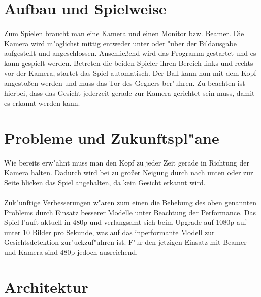 \documentclass[12pt]{article}
\begin{document}
\section{Aufbau und Spielweise}
\paragraph{}
Zum Spielen braucht man eine Kamera und einen Monitor bzw. Beamer. Die Kamera
wird m"oglichst mittig entweder unter oder "uber der Bildausgabe aufgestellt und angeschlossen.
Anschließend wird das Programm gestartet und es kann gespielt werden.
Betreten die beiden Spieler ihren Bereich links und rechts vor der Kamera,
startet das Spiel automatisch. Der Ball kann nun mit dem Kopf angestoßen werden
und muss das Tor des Gegners ber"uhren. Zu beachten ist hierbei, dass
das Gesicht jederzeit gerade zur Kamera gerichtet sein muss, damit es erkannt werden kann.
\section{Probleme und Zukunftspl"ane}
\paragraph{}
Wie bereits erw"ahnt muss man den Kopf zu jeder Zeit gerade in Richtung
der Kamera halten. Dadurch wird bei zu großer Neigung durch nach unten oder zur
Seite blicken das Spiel angehalten, da kein Gesicht erkannt wird.
\paragraph{}
Zuk"unftige Verbesserungen w"aren zum einen die Behebung des oben genannten Problems
durch Einsatz besserer Modelle unter Beachtung der Performance. Das Spiel l"auft aktuell
in 480p und verlangsamt sich beim Upgrade auf 1080p auf unter 10 Bilder pro Sekunde,
was auf das inperformante Modell zur Gesichtsdetektion zur"uckzuf"uhren ist.
F"ur den jetzigen Einsatz mit Beamer und Kamera sind 480p jedoch ausreichend.
\section{Architektur}
\end{document}
